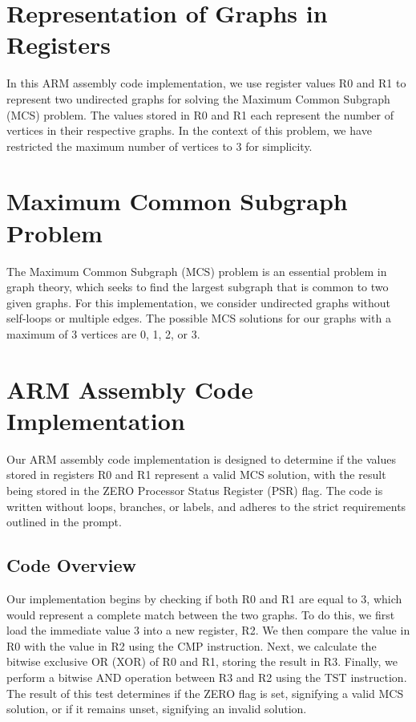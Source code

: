 \section{Representation of Graphs in Registers}

In this ARM assembly code implementation, we use register values R0 and R1 to represent two undirected graphs for solving the Maximum Common Subgraph (MCS) problem. The values stored in R0 and R1 each represent the number of vertices in their respective graphs. In the context of this problem, we have restricted the maximum number of vertices to 3 for simplicity.

\section{Maximum Common Subgraph Problem}

The Maximum Common Subgraph (MCS) problem is an essential problem in graph theory, which seeks to find the largest subgraph that is common to two given graphs. For this implementation, we consider undirected graphs without self-loops or multiple edges. The possible MCS solutions for our graphs with a maximum of 3 vertices are 0, 1, 2, or 3.

\section{ARM Assembly Code Implementation}

Our ARM assembly code implementation is designed to determine if the values stored in registers R0 and R1 represent a valid MCS solution, with the result being stored in the ZERO Processor Status Register (PSR) flag. The code is written without loops, branches, or labels, and adheres to the strict requirements outlined in the prompt.

\subsection{Code Overview}

Our implementation begins by checking if both R0 and R1 are equal to 3, which would represent a complete match between the two graphs. To do this, we first load the immediate value 3 into a new register, R2. We then compare the value in R0 with the value in R2 using the CMP instruction. Next, we calculate the bitwise exclusive OR (XOR) of R0 and R1, storing the result in R3. Finally, we perform a bitwise AND operation between R3 and R2 using the TST instruction. The result of this test determines if the ZERO flag is set, signifying a valid MCS solution, or if it remains unset, signifying an invalid solution.

